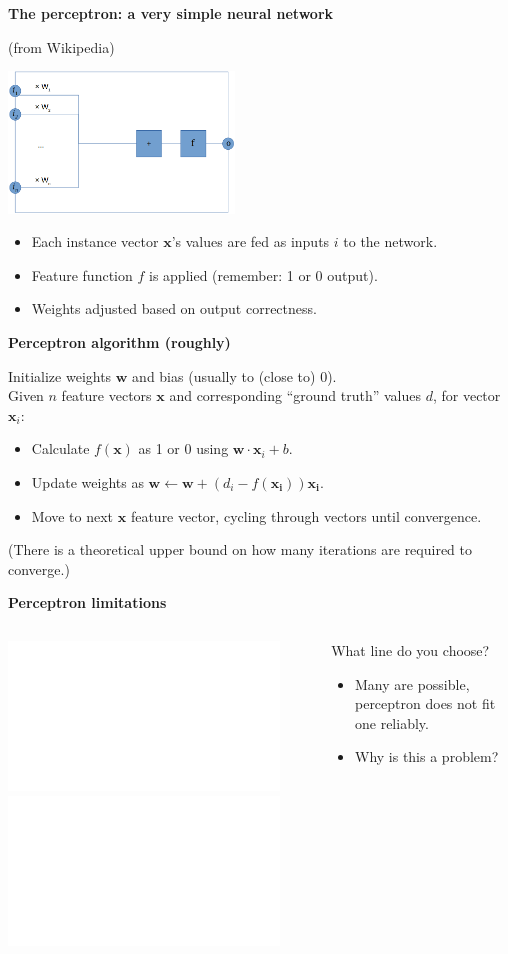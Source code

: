\documentclass{beamer}
\newcommand{\pagestepalt}[2]{
  \begin{frame}[t]
    \begin{minipage}[t][0.26\textheight][t]{\textwidth}
      \begin{center}
        \huge
        \textbf{#1}
      \end{center}
    \end{minipage}
    
    \begin{minipage}[t][0.7\textheight][c]{\textwidth}
      #2
    \end{minipage}
  \end{frame}
}
\begin{document}
\pagestepalt{The perceptron: a very simple neural network}{
  {\small (from Wikipedia)}
  \begin{center}
    \includegraphics[width=0.45\textwidth]{perceptron-cropped.png}
  \end{center}\pause
  \begin{itemize}
  \item Each instance vector $\mathbf{x}$'s values are fed as inputs
    $i$ to the network.\pause
  \item Feature function $f$ is applied (remember: 1 or 0 output).\pause
  \item Weights adjusted based on output correctness.
  \end{itemize}
}

\pagestepalt{Perceptron algorithm (roughly)}{ Initialize weights
  $\mathbf{w}$ and bias (usually to (close to) 0). \\ Given $n$
  feature vectors $\mathbf{x}$ and corresponding ``ground truth'' values $d$, for vector $\mathbf{x}_i$:
  \begin{itemize}
  \item Calculate $f(\mathbf{x})$ as 1 or 0 using $\mathbf{w} \cdot \mathbf{x}_i + b$.
  \item Update weights as $\mathbf{w} \leftarrow \mathbf{w} + (d_i - f(\mathbf{x_i}))\mathbf{x_i}$.
  \item Move to next $\mathbf{x}$ feature vector, cycling through vectors until
    \alert{convergence}.
  \end{itemize}
  (There is a theoretical upper bound on how many iterations are required
  to converge.)
}

\pagestepalt{Perceptron limitations}{
  \begin{columns}[T]
    \begin{column}{0.49\textwidth}
      \begin{center}
        \includegraphics<1>[width=0.9\textwidth]{linsep2.pdf}
        \includegraphics<2->[width=0.9\textwidth]{freedom.pdf}
      \end{center}
    \end{column}

    \begin{column}{0.49\textwidth}
      What line do you choose?\pause
      \begin{itemize}
      \item Many are possible, perceptron does not fit one reliably.\pause
      \item Why is this a problem?
      \end{itemize}
    \end{column}
  \end{columns}
}
\end{document}
